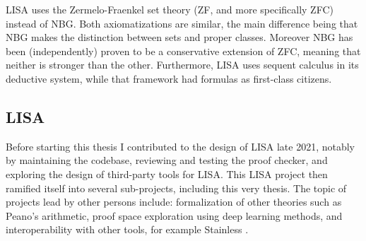LISA uses the Zermelo-Fraenkel set theory (ZF, and more specifically ZFC) instead of NBG. Both axiomatizations are similar, the main difference being that NBG makes the distinction between sets and proper classes. Moreover NBG has been (independently) proven to be a conservative extension of ZFC, meaning that neither is stronger than the other. Furthermore, LISA uses sequent calculus in its deductive system, while that framework had formulas as first-class citizens.

\subsection{LISA}

Before starting this thesis I contributed to the design of LISA late 2021, notably by maintaining the codebase, reviewing and testing the proof checker, and exploring the design of third-party tools for LISA. This LISA project then ramified itself into several sub-projects, including this very thesis. The topic of projects lead by other persons include: formalization of other theories such as Peano's arithmetic, proof space exploration using deep learning methods, and interoperability with other tools, for example Stainless \cite{Kuncak2021}.
